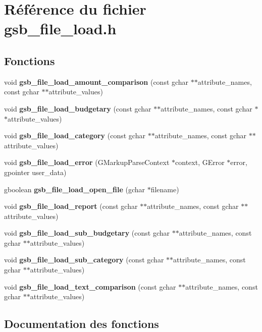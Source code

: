\section{Référence du fichier gsb\_\-file\_\-load.h}
\label{gsb__file__load_8h}
\subsection*{Fonctions}
\begin{DoxyCompactItemize}
\item 
void {\bf gsb\_\-file\_\-load\_\-amount\_\-comparison} (const gchar $\ast$$\ast$attribute\_\-names, const gchar $\ast$$\ast$attribute\_\-values)
\item 
void {\bf gsb\_\-file\_\-load\_\-budgetary} (const gchar $\ast$$\ast$attribute\_\-names, const gchar $\ast$$\ast$attribute\_\-values)
\item 
void {\bf gsb\_\-file\_\-load\_\-category} (const gchar $\ast$$\ast$attribute\_\-names, const gchar $\ast$$\ast$attribute\_\-values)
\item 
void {\bf gsb\_\-file\_\-load\_\-error} (GMarkupParseContext $\ast$context, GError $\ast$error, gpointer user\_\-data)
\item 
gboolean {\bf gsb\_\-file\_\-load\_\-open\_\-file} (gchar $\ast$filename)
\item 
void {\bf gsb\_\-file\_\-load\_\-report} (const gchar $\ast$$\ast$attribute\_\-names, const gchar $\ast$$\ast$attribute\_\-values)
\item 
void {\bf gsb\_\-file\_\-load\_\-sub\_\-budgetary} (const gchar $\ast$$\ast$attribute\_\-names, const gchar $\ast$$\ast$attribute\_\-values)
\item 
void {\bf gsb\_\-file\_\-load\_\-sub\_\-category} (const gchar $\ast$$\ast$attribute\_\-names, const gchar $\ast$$\ast$attribute\_\-values)
\item 
void {\bf gsb\_\-file\_\-load\_\-text\_\-comparison} (const gchar $\ast$$\ast$attribute\_\-names, const gchar $\ast$$\ast$attribute\_\-values)
\end{DoxyCompactItemize}


\subsection{Documentation des fonctions}
